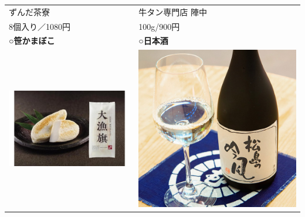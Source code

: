 \begin{table}[H]
\begin{tabular}{ll}
		\begin{minipage}{0.45\textwidth}
			\centering
			{\scriptsize{ずんだ茶寮}}
		\end{minipage} & 
		\begin{minipage}{0.45\textwidth}
			\centering
			{\scriptsize{牛タン専門店 陣中}}
		\end{minipage} \\
		\begin{minipage}{0.45\textwidth}
			\centering
			{\scriptsize{8個入り／1080円}}
		\end{minipage} & 
		\begin{minipage}{0.45\textwidth}
			\centering
			{\scriptsize{100g/900円}}
		\end{minipage} \\
		\textbf{○笹かまぼこ} & \textbf{○日本酒} \\
		\begin{minipage}{0.45\textwidth}
			\centering
			\includegraphics[width=0.7\linewidth]{img/sasakama}
		\end{minipage} &
		\begin{minipage}{0.45\textwidth}
			\centering
			\includegraphics[width=0.7\linewidth]{img/nihonshu}

\end{minipage}
\end{tabular}
\end{table}
